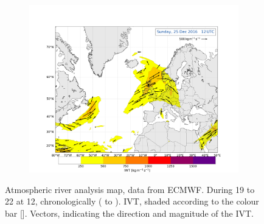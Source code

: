 \begin{figure}[!b]
\begin{subfigure}[b]{\textwidth}
		\includegraphics[trim={4.2cm 0cm 4.3cm 36.8cm},clip,
		width=\textwidth]{./fig_Atm_Riv/20161225_12}
	\end{subfigure}
	\caption{Atmospheric river analysis map, data from ECMWF. During \num{19} to \SI{22}{\dec} at \SI{12}{\UTC}, chronologically (\protect{} to \protect{}). IVT, shaded according to the colour bar [\SI{}{\IVT}]. Vectors, indicating the direction and magnitude of the IVT. }\label{fig:AtmRiv_00}
\end{figure}
\noindent
